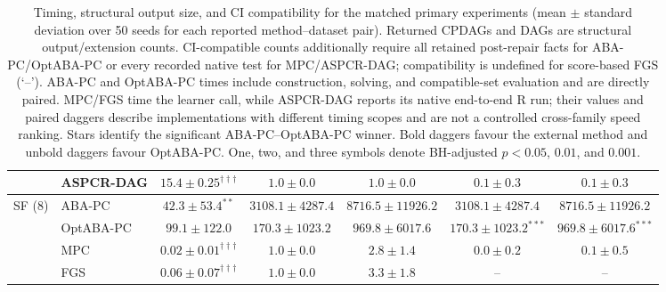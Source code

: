 \begin{table}[t]
{\begin{tabular}{llccccc}
 & ASPCR-DAG & $15.4\pm0.25^{\dagger\dagger\dagger}$ & $1.0\pm0.0$ & $1.0\pm0.0$ & $0.1\pm0.3$ & $0.1\pm0.3$\\
\midrule
SF (8) & ABA-PC & $\mathbf{42.3\pm53.4}^{**}$ & $3108.1\pm4287.4$ & $8716.5\pm11926.2$ & $3108.1\pm4287.4$ & $8716.5\pm11926.2$\\
 & OptABA-PC & $99.1\pm122.0$ & $170.3\pm1023.2$ & $969.8\pm6017.6$ & $\mathbf{170.3\pm1023.2}^{***}$ & $\mathbf{969.8\pm6017.6}^{***}$\\
 & MPC & $\mathbf{0.02\pm0.01}^{\dagger\dagger\dagger}$ & $1.0\pm0.0$ & $2.8\pm1.4$ & $0.0\pm0.2$ & $0.1\pm0.5$\\
 & FGS & $\mathbf{0.06\pm0.07}^{\dagger\dagger\dagger}$ & $1.0\pm0.0$ & $3.3\pm1.8$ & -- & --\\
\bottomrule
\end{tabular}
}%
\caption{Timing, structural output size, and CI compatibility for the matched primary experiments (mean $\pm$ standard deviation over 50 seeds for each reported method--dataset pair). Returned CPDAGs and DAGs are structural output/extension counts. CI-compatible counts additionally require all retained post-repair facts for ABA-PC/OptABA-PC or every recorded native test for MPC/ASPCR-DAG; compatibility is undefined for score-based FGS (`--'). ABA-PC and OptABA-PC times include construction, solving, and compatible-set evaluation and are directly paired. MPC/FGS time the learner call, while ASPCR-DAG reports its native end-to-end R run; their values and paired daggers describe implementations with different timing scopes and are not a controlled cross-family speed ranking. Stars identify the significant ABA-PC--OptABA-PC winner. Bold daggers favour the external method and unbold daggers favour OptABA-PC. One, two, and three symbols denote BH-adjusted $p<0.05$, $0.01$, and $0.001$.}
\label{tab:final-runtime-completion}
\end{table}
